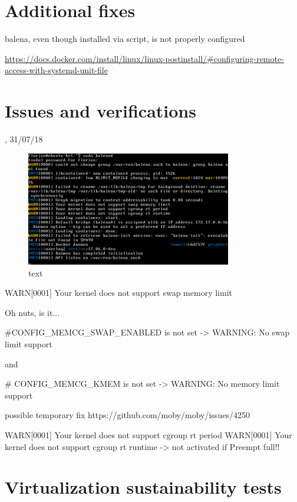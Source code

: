 \documentclass[]{scrartcl}
\begin{document}
\section{Additional fixes}

balena, even though installed via script, is not properly configured

\url{https://docs.docker.com/install/linux/linux-postinstall/#configuring-remote-access-with-systemd-unit-file}


\section{Issues and verifications}

{\small\textsc{, 31/07/18} \bigskip}



\begin{figure}
	\centering
	\includegraphics[width=0.8\textwidth]{balena-err}
	\caption{text}
\end{figure}

WARN[0001] Your kernel does not support swap memory limit 

Oh nuts, is it...

\#CONFIG\_MEMCG\_SWAP\_ENABLED is not set -> WARNING: No swap limit support

and

\# CONFIG\_MEMCG\_KMEM is not set -> WARNING: No memory limit support

possible temporary fix https://github.com/moby/moby/issues/4250



WARN[0001] Your kernel does not support cgroup rt period 
WARN[0001] Your kernel does not support cgroup rt runtime 
-> not activated if Preempt full!!

\section{Virtualization sustainability tests}
\end{document}

